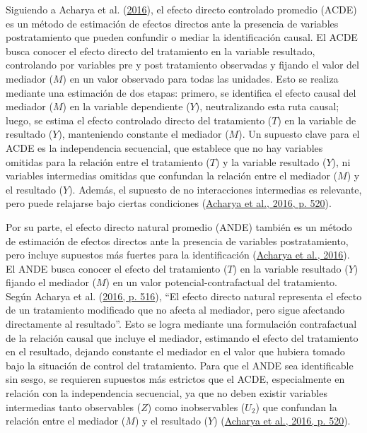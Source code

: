 \documentclass[
  12pt,
  a4paper,
]{article}
\begin{document}
Siguiendo a Acharya et al. (\protect\hyperlink{ref-acharya_explaining_2016}{2016}), el efecto directo controlado promedio (ACDE) es un método de estimación de efectos directos ante la presencia de variables postratamiento que pueden confundir o mediar la identificación causal. El ACDE busca conocer el efecto directo del tratamiento en la variable resultado, controlando por variables pre y post tratamiento observadas y fijando el valor del mediador (\(M\)) en un valor observado para todas las unidades. Esto se realiza mediante una estimación de dos etapas: primero, se identifica el efecto causal del mediador (\(M\)) en la variable dependiente (\(Y\)), neutralizando esta ruta causal; luego, se estima el efecto controlado directo del tratamiento (\(T\)) en la variable de resultado (\(Y\)), manteniendo constante el mediador (\(M\)). Un supuesto clave para el ACDE es la independencia secuencial, que establece que no hay variables omitidas para la relación entre el tratamiento (\(T\)) y la variable resultado (\(Y\)), ni variables intermedias omitidas que confundan la relación entre el mediador (\(M\)) y el resultado (\(Y\)). Además, el supuesto de no interacciones intermedias es relevante, pero puede relajarse bajo ciertas condiciones (\protect\hyperlink{ref-acharya_explaining_2016}{Acharya et al., 2016, p. 520}).

Por su parte, el efecto directo natural promedio (ANDE) también es un método de estimación de efectos directos ante la presencia de variables postratamiento, pero incluye supuestos más fuertes para la identificación (\protect\hyperlink{ref-acharya_explaining_2016}{Acharya et al., 2016}). El ANDE busca conocer el efecto del tratamiento (\(T\)) en la variable resultado (\(Y\)) fijando el mediador (\(M\)) en un valor potencial-contrafactual del tratamiento. Según Acharya et al. (\protect\hyperlink{ref-acharya_explaining_2016}{2016, p. 516}), ``El efecto directo natural representa el efecto de un tratamiento modificado que no afecta al mediador, pero sigue afectando directamente al resultado''. Esto se logra mediante una formulación contrafactual de la relación causal que incluye el mediador, estimando el efecto del tratamiento en el resultado, dejando constante el mediador en el valor que hubiera tomado bajo la situación de control del tratamiento. Para que el ANDE sea identificable sin sesgo, se requieren supuestos más estrictos que el ACDE, especialmente en relación con la independencia secuencial, ya que no deben existir variables intermedias tanto observables (\(Z\)) como inobservables (\(U_2\)) que confundan la relación entre el mediador (\(M\)) y el resultado (\(Y\)) (\protect\hyperlink{ref-acharya_explaining_2016}{Acharya et al., 2016, p. 520}).
\end{document}
